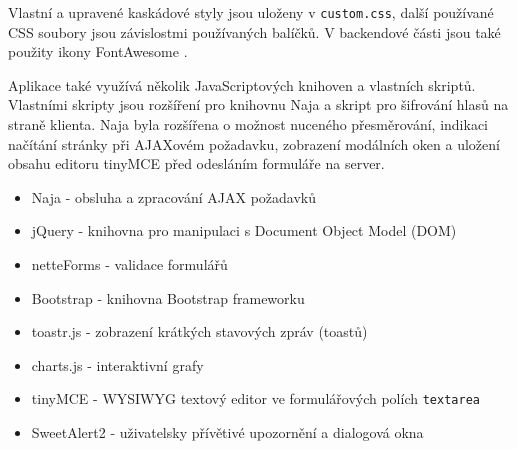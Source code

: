 Vlastní a upravené kaskádové styly jsou uloženy v \texttt{custom.css}, další používané CSS soubory jsou závislostmi používaných balíčků. V backendové části jsou také použity ikony FontAwesome \cite{FontAwesome}.


Aplikace také využívá několik JavaScriptových knihoven a vlastních skriptů. Vlastními skripty jsou rozšíření pro knihovnu Naja a skript pro šifrování hlasů na straně klienta. Naja byla rozšířena o možnost nuceného přesměrování, indikaci načítání stránky při AJAXovém požadavku, zobrazení modálních oken a uložení obsahu editoru tinyMCE před odesláním formuláře na server.
\begin{itemize}
	\item Naja - obsluha a zpracování AJAX požadavků
	\item jQuery - knihovna pro manipulaci s Document Object Model (DOM)
	\item netteForms - validace formulářů
	\item Bootstrap - knihovna Bootstrap frameworku
	\item toastr.js - zobrazení krátkých stavových zpráv (toastů)
	\item charts.js - interaktivní grafy
	\item tinyMCE - WYSIWYG textový editor ve formulářových polích \texttt{textarea}
	\item SweetAlert2 - uživatelsky přívětivé upozornění a dialogová okna
\end{itemize}
